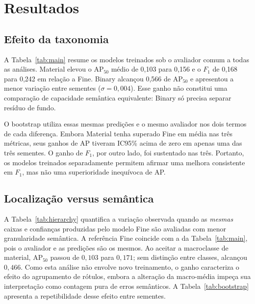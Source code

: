 \section{Resultados}

\subsection{Efeito da taxonomia}

A Tabela~\ref{tab:main} resume os modelos treinados sob o avaliador comum a todas as análises. Material elevou o AP$_{50}$ médio de 0,103 para 0,156 e o $F_1$ de 0,168 para 0,242 em relação a Fine. Binary alcançou 0,566 de AP$_{50}$ e apresentou a menor variação entre sementes ($\sigma=0{,}004$). Esse ganho não constitui uma comparação de capacidade semântica equivalente: Binary só precisa separar resíduo de fundo.

\begin{table}[H]
  \centering
  \caption{Modelos treinados por taxonomia, sob o avaliador comum: média $\pm$ desvio-padrão de três sementes.}
  \label{tab:main}
  \resizebox{\linewidth}{!}{}
\end{table}

O bootstrap utiliza essas mesmas predições e o mesmo avaliador nos dois termos de cada diferença. Embora Material tenha superado Fine em média nas três métricas, seus ganhos de AP tiveram IC95\% acima de zero em apenas uma das três sementes. O ganho de $F_1$, por outro lado, foi sustentado nas três. Portanto, os modelos treinados separadamente permitem afirmar uma melhora consistente em $F_1$, mas não uma superioridade inequívoca de AP.

\subsection{Localização versus semântica}

A Tabela~\ref{tab:hierarchy} quantifica a variação observada quando as \emph{mesmas} caixas e confianças produzidas pelo modelo Fine são avaliadas com menor granularidade semântica. A referência Fine coincide com a da Tabela~\ref{tab:main}, pois o avaliador e as predições são os mesmos. Ao aceitar a macroclasse de material, AP$_{50}$ passou de $0{,}103$ para $0{,}171$; sem distinção entre classes, alcançou $0{,}466$. Como esta análise não envolve novo treinamento, o ganho caracteriza o efeito do agrupamento de rótulos, embora a alteração da macro-média impeça sua interpretação como contagem pura de erros semânticos. A Tabela~\ref{tab:bootstrap} apresenta a repetibilidade desse efeito entre sementes.

